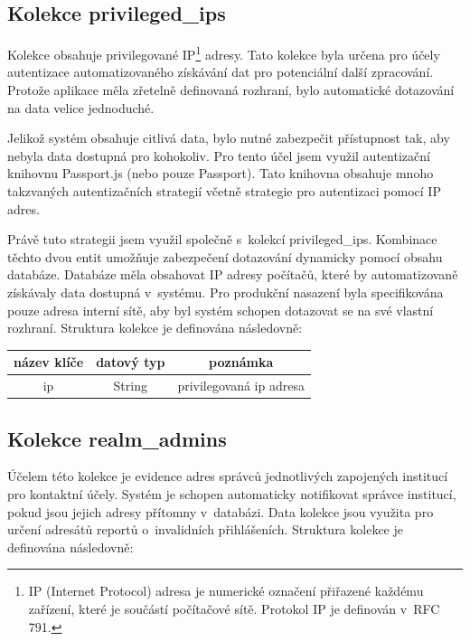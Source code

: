 \documentclass[thesis=M,czech]{FITthesis}[2012/06/26]
\begin{document}
    \subsection{Kolekce privileged\_ips}
      
      Kolekce obsahuje privilegované IP\footnote{
        IP (Internet Protocol) adresa je numerické označení přiřazené každému zařízení, které je součástí počítačové sítě.
        Protokol IP je definován v~RFC 791.
      } adresy. 
      Tato kolekce byla určena pro účely autentizace automatizovaného získávání dat
      pro potenciální další zpracování.
      Protože aplikace měla zřetelně definovaná rozhraní,
      bylo automatické dotazování na data velice jednoduché.

      Jelikož systém obsahuje citlivá data, bylo nutné zabezpečit
      přístupnost tak, aby nebyla data dostupná pro kohokoliv.
      Pro tento účel jsem využil autentizační knihovnu Passport.js (nebo pouze Passport).
      Tato knihovna obsahuje mnoho takzvaných autentizačních strategií včetně strategie pro
      autentizaci pomocí IP adres.
      
      Právě tuto strategii jsem využil společně s~kolekcí privileged\_ips.
      Kombinace těchto dvou entit umožňuje zabezpečení dotazování
      dynamicky pomocí obsahu databáze.
      Databáze měla obsahovat IP adresy počítačů, které by automatizovaně získávaly
      data dostupná v~systému. 
      Pro produkční nasazení byla specifikována pouze adresa interní sítě,
      aby byl systém schopen dotazovat se na své vlastní rozhraní.
      Struktura kolekce je definována následovně:
    
      \begin{center}
        \begin{tabular}{ | c | c | c | }
          \hline
            název klíče   & datový typ & poznámka                  \\ \hline
            ip            & String     & privilegovaná ip adresa   \\
          \hline
        \end{tabular}
      \end{center}
    
    \subsection{Kolekce realm\_admins}
    
      Účelem této kolekce je evidence adres správců jednotlivých 
      zapojených institucí pro kontaktní účely.
      Systém je schopen automaticky notifikovat správce institucí,
      pokud jsou jejich adresy přítomny v~databázi.
      Data kolekce jsou využita pro určení adresátů reportů o~invalidních přihlášeních.
      Struktura kolekce je definována následovně:
\end{document}
